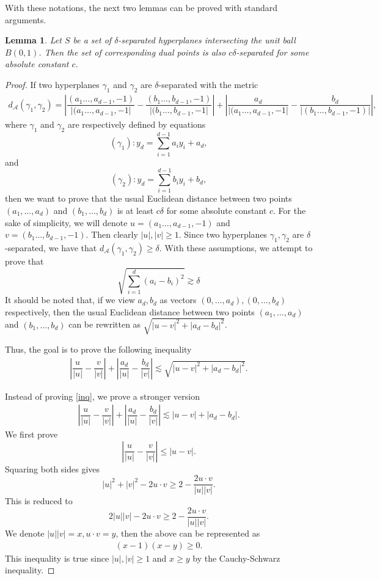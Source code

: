 \documentclass[11pt]{article}
\newtheorem{lemma}[theorem]{Lemma}
\newcommand{\1}{\mathbf{1}}
\begin{document}
With these notations, the next two lemmas can be proved with standard arguments. 
\begin{lemma}\label{lm1}
    Let $S$ be a set of $\delta$-separated hyperplanes intersecting the unit ball $B(0, 1)$. Then the set of corresponding dual points is also $c\delta$-separated for some absolute constant $c$.
\end{lemma}
\begin{proof}
If two hyperplanes $\gamma_1$ and $\gamma_2$ are $\delta$-separated with the metric
\begin{align*}
d_\mathcal{A}\left(\gamma_1,\gamma_2\right) = \left|\dfrac{(a_1\ldots,a_{d-1},-1)}{\left|(a_1\ldots,a_{d-1},-1\right|}-\dfrac{(b_1\ldots,b_{d-1},-1)}{\left|(b_1\ldots,b_{d-1},-1\right|}\right|+\left|\dfrac{a_d}{\left|(a_1\ldots,a_{d-1},-1\right|}-\dfrac{b_d}{\left|(b_1\ldots,b_{d-1},-1)\right|}\right|,
\end{align*}
where $\gamma_1$ and $\gamma_2$ are respectively defined by equations
  \[(\gamma_1): y_d=\sum_{i=1}^{d-1}a_iy_i+a_d,\]
    and 
\[(\gamma_2): y_d=\sum_{i=1}^{d-1}b_iy_i+b_d,\]
then we want to prove that the usual Euclidean distance between two points $(a_1, \ldots, a_d)$ and $(b_1, \ldots, b_d)$ is at least $c\delta$ for some absolute constant $c$. 
    For the sake of simplicity, we will denote $u=(a_1\ldots,a_{d-1},-1)$ and $v =(b_1\ldots,b_{d-1},-1) $. Then clearly $|u|,|v| \ge 1$. Since two hyperplanes $\gamma_1, \gamma_2$ are $\delta$-separated, we have that $d_\mathcal{A}\left(\gamma_1,\gamma_2\right) \ge \delta$. With these assumptions, we attempt to prove that 
    \[ \sqrt{\sum_{i=1}^d (a_i-b_i)^2} \gtrsim \delta\]
    It should be noted that, if we view $a_d,b_d$ as vectors $(0,\ldots,a_d), (0,\ldots,b_d)$ respectively, then the usual Euclidean distance between two points $(a_1, \ldots, a_d)$ and $(b_1, \ldots, b_d)$ can be rewritten as $\sqrt{|u-v|^2+|a_d-b_d|^2}$.

Thus, the goal is to prove the following inequality
\begin{align}\label{inq}
    \left|\dfrac{u}{|u|}-\dfrac{v}{|v|}\right|+\left|\dfrac{a_d}{|u|}-\dfrac{b_d}{|v|}\right|\lesssim  \sqrt{|u-v|^2+|a_d-b_d|^2}.
\end{align}

Instead of proving \ref{inq}, we prove a stronger version
\begin{align}
    \left|\dfrac{u}{|u|}-\dfrac{v}{|v|}\right|+\left|\dfrac{a_d}{|u|}-\dfrac{b_d}{|v|}\right|\lesssim |u-v| +|a_d-b_d|.
\end{align}\label{inq1}
We first prove 
\[\left|\dfrac{u}{|u|}-\dfrac{v}{|v|}\right| \le |u-v|. \]
Squaring both sides gives
\[|u|^2+|v|^2-2u\cdot v\ge 2-\dfrac{2u\cdot v}{|u||v|}.\] 
This is reduced to
\[2|u||v|-2u\cdot v \ge 2-\dfrac{2u\cdot v}{|u||v|}.\]
We denote $|u||v|=x, u\cdot v=y$, then the above can be represented as
\begin{align*}
           (x-1)(x-y) \ge 0.
\end{align*}
This inequality is true since $|u|,|v| \ge 1$ and $x \ge y$ by the Cauchy-Schwarz inequality.


\end{proof}
\end{document}
